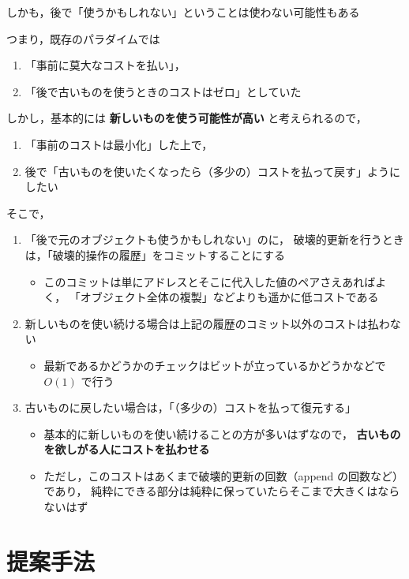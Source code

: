 \documentclass[10pt, a4j, twocolumn]{scrartcl}
\begin{document}
しかも，後で「使うかもしれない」ということは使わない可能性もある

つまり，既存のパラダイムでは
\begin{enumerate}
\item 「事前に莫大なコストを払い」，
\item 「後で古いものを使うときのコストはゼロ」としていた
\end{enumerate}

しかし，基本的には \textbf{\textbf{新しいものを使う可能性が高い}} と考えられるので，
\begin{enumerate}
\item 「事前のコストは最小化」した上で，
\item 後で「古いものを使いたくなったら（多少の）コストを払って戻す」ようにしたい
\end{enumerate}


そこで，
\begin{enumerate}
\item 「後で元のオブジェクトも使うかもしれない」のに，
破壊的更新を行うときは，「破壊的操作の履歴」をコミットすることにする
\begin{itemize}
\item このコミットは単にアドレスとそこに代入した値のペアさえあればよく，
「オブジェクト全体の複製」などよりも遥かに低コストである
\end{itemize}
\item 新しいものを使い続ける場合は上記の履歴のコミット以外のコストは払わない
\begin{itemize}
\item 最新であるかどうかのチェックはビットが立っているかどうかなどで \(O(1)\) で行う
\end{itemize}
\item 古いものに戻したい場合は，「（多少の）コストを払って復元する」
\begin{itemize}
\item 基本的に新しいものを使い続けることの方が多いはずなので，
\textbf{\textbf{古いものを欲しがる人にコストを払わせる}}
\item ただし，このコストはあくまで破壊的更新の回数（append の回数など）であり，
純粋にできる部分は純粋に保っていたらそこまで大きくはならないはず
\end{itemize}
\end{enumerate}


\section{提案手法}
\label{sec:orgb6c37be}
\end{document}
